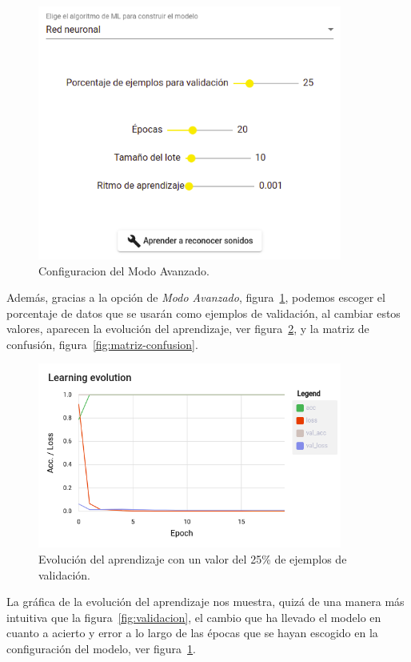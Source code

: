 \documentclass[a4paper, 12pt]{book}
\begin{document}
\begin{figure}
	\centering
	\includegraphics[width=10cm, keepaspectratio]{img/configuracion-25.png}
	\caption{Configuracion del Modo Avanzado.}\label{fig:configuracion}
\end{figure}

Además, gracias a la opción de \textit{Modo Avanzado}, figura~\ref{fig:configuracion}, podemos escoger el porcentaje de datos que se usarán como ejemplos de validación, al cambiar estos valores, aparecen la evolución del aprendizaje, ver figura~\ref{fig:learning-evolution}, y la matriz de confusión, figura~\ref{fig:matriz-confusion}.

\begin{figure}
	\centering
	\includegraphics[width=10cm, keepaspectratio]{img/learning-evolution-25.png}
	\caption{Evolución del aprendizaje con un valor del 25\% de ejemplos de validación.}\label{fig:learning-evolution}
\end{figure}

La gráfica de la evolución del aprendizaje nos muestra, quizá de una manera más intuitiva que la figura~\ref{fig:validacion}, el cambio que ha llevado el modelo en cuanto a acierto y error a lo largo de las épocas que se hayan escogido en la configuración del modelo, ver figura~\ref{fig:configuracion}.
\end{document}
